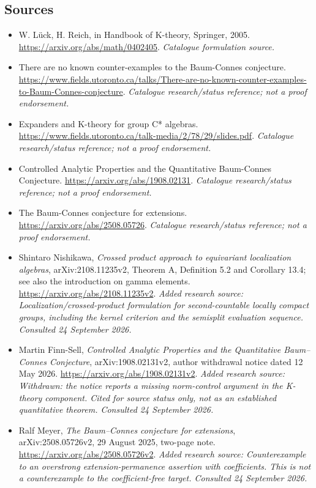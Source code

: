 \documentclass[11pt]{article}
\begin{document}
\subsection{Sources}
\begin{itemize}\raggedright
\item[\textnormal{[S1]}]\hypertarget{source:53:1}{} W. Lück, H. Reich, in Handbook of K-theory, Springer, 2005.
\url{https://arxiv.org/abs/math/0402405}.
{\small\textit{Catalogue formulation source.}}
\item[\textnormal{[S2]}]\hypertarget{source:53:2}{} There are no known counter-examples to the Baum-Connes conjecture.
\url{https://www.fields.utoronto.ca/talks/There-are-no-known-counter-examples-to-Baum-Connes-conjecture}.
{\small\textit{Catalogue research/status reference; not a proof endorsement.}}
\item[\textnormal{[S3]}]\hypertarget{source:53:3}{} Expanders and K-theory for group C* algebras.
\url{https://www.fields.utoronto.ca/talk-media/2/78/29/slides.pdf}.
{\small\textit{Catalogue research/status reference; not a proof endorsement.}}
\item[\textnormal{[S4]}]\hypertarget{source:53:4}{} Controlled Analytic Properties and the Quantitative Baum-Connes Conjecture.
\url{https://arxiv.org/abs/1908.02131}.
{\small\textit{Catalogue research/status reference; not a proof endorsement.}}
\item[\textnormal{[S5]}]\hypertarget{source:53:5}{} The Baum-Connes conjecture for extensions.
\url{https://arxiv.org/abs/2508.05726}.
{\small\textit{Catalogue research/status reference; not a proof endorsement.}}
\item[\textnormal{[E1]}]\hypertarget{extra:53:1}{} Shintaro Nishikawa, \emph{Crossed product approach to equivariant localization algebras}, arXiv:2108.11235v2, Theorem A, Definition 5.2 and Corollary 13.4; see also the introduction on gamma elements.
\url{https://arxiv.org/abs/2108.11235v2}.
{\small\textit{Added research source: Localization/crossed-product formulation for second-countable locally compact groups, including the kernel criterion and the semisplit evaluation sequence. Consulted 24 September 2026.}}
\item[\textnormal{[E2]}]\hypertarget{extra:53:2}{} Martin Finn-Sell, \emph{Controlled Analytic Properties and the Quantitative Baum--Connes Conjecture}, arXiv:1908.02131v2, author withdrawal notice dated 12 May 2026.
\url{https://arxiv.org/abs/1908.02131v2}.
{\small\textit{Added research source: Withdrawn: the notice reports a missing norm-control argument in the K-theory component. Cited for source status only, not as an established quantitative theorem. Consulted 24 September 2026.}}
\item[\textnormal{[E3]}]\hypertarget{extra:53:3}{} Ralf Meyer, \emph{The Baum--Connes conjecture for extensions}, arXiv:2508.05726v2, 29 August 2025, two-page note.
\url{https://arxiv.org/abs/2508.05726v2}.
{\small\textit{Added research source: Counterexample to an overstrong extension-permanence assertion with coefficients. This is not a counterexample to the coefficient-free target. Consulted 24 September 2026.}}
\end{itemize}
\end{document}
